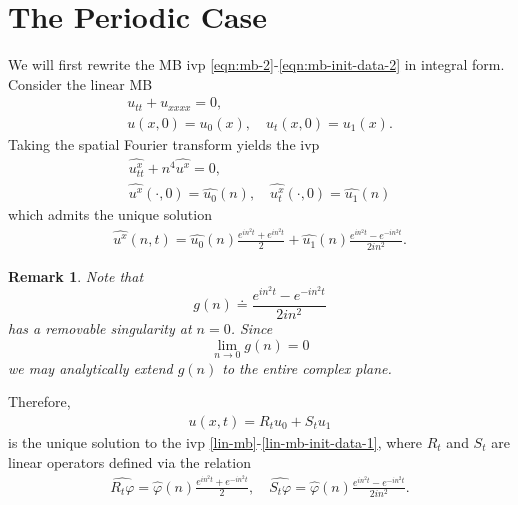 \documentclass[12pt,reqno]{amsart}
\numberwithin{equation}{section}  %
\numberwithin{figure}{section}
\newcommand{\wh}{\widehat}
\newcommand{\vp}{\varphi}
\newtheorem{remark}[theorem]{Remark}
\begin{document}
\section{The Periodic Case} 
\label{sec:periodic-case}
We will first rewrite the MB ivp
\eqref{eqn:mb-2}-\eqref{eqn:mb-init-data-2} in integral form. Consider
the linear MB
\begin{gather}
  u_{tt} + u_{xxxx} = 0,
  \label{lin-mb}
  \\
  u(x, 0)=u_{0}(x), \quad u_{t}(x,0) = u_{1}(x).
  \label{lin-mb-init-data-1}
\end{gather}
Taking the spatial Fourier transform yields the ivp
\begin{gather*}
  \wh{u_{tt}^{x}} + n^{4} \wh{u^{x}} = 0,
  \\
  \wh{u^{x}}(\cdot, 0) = \wh{u_{0}}(n), \quad
  \wh{u_{t}^{x}}(\cdot, 0) = \wh{u_{1}}(n)
\end{gather*}
which admits the unique solution
%
%
\begin{equation*}
  \begin{split}
    \wh{u^{x}}(n, t) = \wh{u_{0}}(n) \frac{e^{in^{2}t} + e^{in^{2}t}}{2} + 
    \wh{u_{1}}(n) \frac{e^{in^{2}t} - e^{-in^{2}t}}{2i n^{2}}.
  \end{split}
\end{equation*}
%
%
%
%
\begin{framed}
\begin{remark}
  Note that $$g(n) \doteq \frac{e^{in^{2}t} - e^{-in^{2}t}}{2i n^{2}}$$ has a removable
  singularity at $n=0$. Since $$\lim_{n \to 0} g(n) = 0$$ we may analytically
  extend $g(n)$ to the entire complex plane. 
\label{rem:analytic-extension}
\end{remark}
\end{framed}
%
%
%
Therefore,
%
%
\begin{equation*}
  \begin{split}
    u(x,t) = R_t u_{0} + S_{t}u_{1}
  \end{split}
\end{equation*}
%
is the unique solution to the ivp
\eqref{lin-mb}-\eqref{lin-mb-init-data-1}, where $R_{t}$ and $S_{t}$ are linear operators defined via the relation
%
%
\begin{gather*}
  \wh{R_{t}\vp} = \wh{\vp}(n) \frac{e^{in^{2}t} + e^{-in^{2}t}}{2} , \quad 
  \wh{S_{t}\vp} = \wh{\vp}(n) \frac{e^{in^{2}t} - e^{-in^{2}t}}{2i n^{2}}.
\end{gather*}
\end{document}
